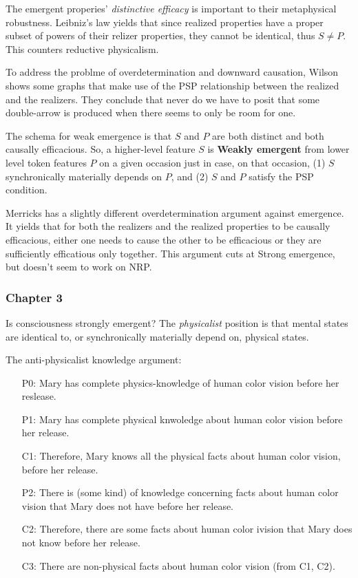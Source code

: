 \documentclass{article}
\newcommand{\ti}[1]{\textit{#1}}
\newcommand{\tb}[1]{\textbf{#1}}
\begin{document}
The emergent properies' \ti{distinctive efficacy} is important to their metaphysical robustness. Leibniz's law yields that since realized properties have a proper subset of powers of their relizer properties, they cannot be identical, thus $S \neq P$. This counters reductive physicalism.

To address the problme of overdetermination and downward causation, Wilson shows some graphs that make use of the PSP relationship between the realized and the realizers. They conclude that never do we have to posit that some double-arrow is produced when there seems to only be room for one.

The schema for weak emergence is that $S$ and $P$ are both distinct and both causally efficacious. So, a higher-level feature $S$ is \tb{Weakly emergent} from lower level token features $P$ on a given occasion just in case, on that occasion, (1) $S$ synchronically materially depends on $P$, and (2) $S$ and $P$ satisfy the PSP condition.

Merricks has a slightly different overdetermination argument against emergence. It yields that for both the realizers and the realized properties to be causally efficacious, either one needs to cause the other to be efficacious or they are sufficiently efficatious only together. This argument cuts at Strong emergence, but doesn't seem to work on NRP.

\subsubsection*{Chapter 3}

Is consciousness strongly emergent? The \ti{physicalist} position is that mental states are identical to, or synchronically materially depend on, physical states.

The anti-physicalist knowledge argument:

\begin{enumerate}
\item[P0:] Mary has complete physics-knowledge of human color vision before her reslease.
\item[P1:] Mary has complete physical knwoledge about human color vision before her release.
\item[C1:] Therefore, Mary knows all the physical facts about human color vision, before her release.
\item[P2:] There is (some kind) of knowledge concerning facts about human color vision that Mary does not have before her release.
\item[C2:] Therefore, there are some facts about human color ivision that Mary does not know before her release.
\item[C3:] There are non-physical facts about human color vision (from C1, C2).
\end{enumerate}
\end{document}
